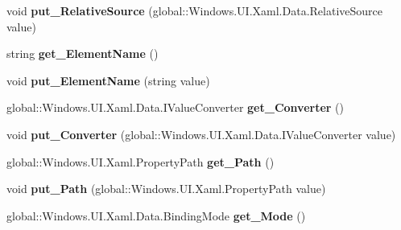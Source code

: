 \begin{DoxyCompactItemize}
void {\bfseries put\+\_\+\+Relative\+Source} (global\+::\+Windows.\+U\+I.\+Xaml.\+Data.\+Relative\+Source value)
\item 
\mbox{\label{interface_windows_1_1_u_i_1_1_xaml_1_1_data_1_1_i_binding_a0dd35d95c316a5990ee063205f2afa4f}} 
string {\bfseries get\+\_\+\+Element\+Name} ()
\item 
\mbox{\label{interface_windows_1_1_u_i_1_1_xaml_1_1_data_1_1_i_binding_a4a547237eb0c5a322ff147af7bffa296}} 
void {\bfseries put\+\_\+\+Element\+Name} (string value)
\item 
\mbox{\label{interface_windows_1_1_u_i_1_1_xaml_1_1_data_1_1_i_binding_aeb748478fa74d3af88e1a82f20a682c4}} 
global\+::\+Windows.\+U\+I.\+Xaml.\+Data.\+I\+Value\+Converter {\bfseries get\+\_\+\+Converter} ()
\item 
\mbox{\label{interface_windows_1_1_u_i_1_1_xaml_1_1_data_1_1_i_binding_a6f90eb586d1b47f03de725076ef98329}} 
void {\bfseries put\+\_\+\+Converter} (global\+::\+Windows.\+U\+I.\+Xaml.\+Data.\+I\+Value\+Converter value)
\item 
\mbox{\label{interface_windows_1_1_u_i_1_1_xaml_1_1_data_1_1_i_binding_a9ca632846713b560304c9843f74ed7a8}} 
global\+::\+Windows.\+U\+I.\+Xaml.\+Property\+Path {\bfseries get\+\_\+\+Path} ()
\item 
\mbox{\label{interface_windows_1_1_u_i_1_1_xaml_1_1_data_1_1_i_binding_a196462b99c9682d263adef2e1bbefa09}} 
void {\bfseries put\+\_\+\+Path} (global\+::\+Windows.\+U\+I.\+Xaml.\+Property\+Path value)
\item 
\mbox{\label{interface_windows_1_1_u_i_1_1_xaml_1_1_data_1_1_i_binding_a0b5420b11dcee1ba04cc22736c406538}} 
global\+::\+Windows.\+U\+I.\+Xaml.\+Data.\+Binding\+Mode {\bfseries get\+\_\+\+Mode} ()
\item 
\mbox{\label{interface_windows_1_1_u_i_1_1_xaml_1_1_data_1_1_i_binding_a1677010e1baf985a2a7cb5a399ca34a8}} 

\end{DoxyCompactItemize}

